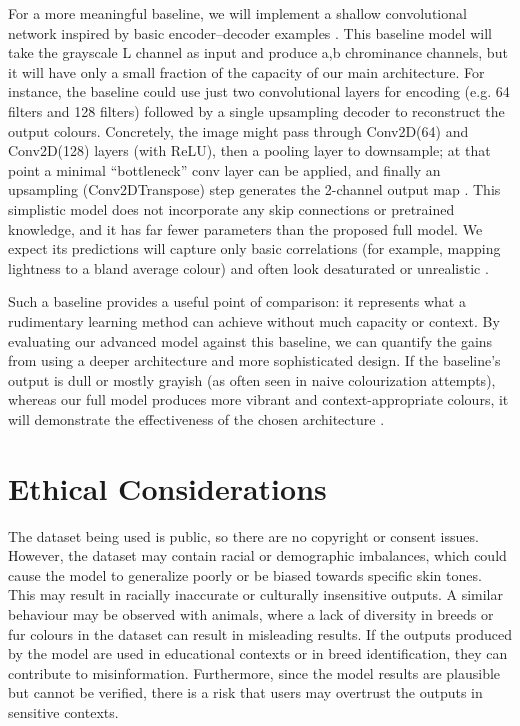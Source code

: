 \documentclass{article} %
\begin{document}
For a more meaningful baseline, we will implement a shallow convolutional network inspired by basic encoder–decoder examples \cite{leatvanich2025image}. This baseline model will take the grayscale L channel as input and produce a,b chrominance channels, but it will have only a small fraction of the capacity of our main architecture. For instance, the baseline could use just two convolutional layers for encoding (e.g. 64 filters and 128 filters) followed by a single upsampling decoder to reconstruct the output colours. Concretely, the image might pass through Conv2D(64) and Conv2D(128) layers (with ReLU), then a pooling layer to downsample; at that point a minimal “bottleneck” conv layer can be applied, and finally an upsampling (Conv2DTranspose) step generates the 2-channel output map \cite{leatvanich2025image}. This simplistic model does not incorporate any skip connections or pretrained knowledge, and it has far fewer parameters than the proposed full model. We expect its predictions will capture only basic correlations (for example, mapping lightness to a bland average colour) and often look desaturated or unrealistic \cite{rosebrock2019bwcolorization}.

Such a baseline provides a useful point of comparison: it represents what a rudimentary learning method can achieve without much capacity or context. By evaluating our advanced model against this baseline, we can quantify the gains from using a deeper architecture and more sophisticated design. If the baseline’s output is dull or mostly grayish (as often seen in naive colourization attempts), whereas our full model produces more vibrant and context-appropriate colours, it will demonstrate the effectiveness of the chosen architecture \cite{rosebrock2019bwcolorization}.

\section{Ethical Considerations}
\label{ethical}

The dataset being used is public, so there are no copyright or consent issues. However, the dataset may contain racial or demographic imbalances, which could cause the model 
to generalize poorly or be biased towards specific skin tones. This may result in racially inaccurate or culturally insensitive outputs. A similar behaviour may be observed with 
animals, where a lack of diversity in breeds or fur colours in the dataset can result in misleading results. If the outputs produced by the model are used in educational contexts 
or in breed identification, they can contribute to misinformation. Furthermore, since the model results are plausible but cannot be verified, there is a risk that users may 
overtrust the outputs in sensitive contexts.
\end{document}
